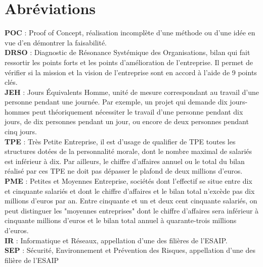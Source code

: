 \section*{Abréviations}

\textbf{POC} : Proof of Concept, réalisation incomplète d'une méthode ou d'une idée en vue d'en démontrer la faisabilité.\cite{POC}
\hfill \\

\textbf{DRSO} : Diagnostic de Résonance Systémique des Organisations, bilan qui fait ressortir les points forts et les points d'amélioration de l'entreprise. Il permet de vérifier si la mission et la vision de l'entreprise sont en accord à l'aide de 9 points clés.\cite{DRSO}
\hfill \\

\textbf{JEH} : Jours Équivalents Homme, unité de mesure correspondant au travail d’une personne pendant une journée. Par exemple, un projet qui demande dix jours-hommes peut théoriquement nécessiter le travail d’une personne pendant dix jours, de dix personnes pendant un jour, ou encore de deux personnes pendant cinq jours.\cite{JEH}
\hfill \\

\textbf{TPE} : Très Petite Entreprise, il est d'usage de qualifier de TPE toutes les structures dotées de la personnalité morale, dont le nombre maximal de salariés est inférieur à dix. Par ailleurs, le chiffre d’affaires annuel ou le total du bilan réalisé par ces TPE ne doit pas dépasser le plafond de deux millions d’euros.\cite{TPEPME}
\hfill \\

\textbf{PME} : Petites et Moyennes Entreprise, sociétés dont l'effectif se situe entre dix et cinquante salariés et dont le chiffre d’affaires et le bilan total n'excède pas dix millions d’euros par an. Entre cinquante et un et deux cent cinquante salariés, on peut distinguer les "moyennes entreprises" dont le chiffre d’affaires sera inférieur à cinquante millions d’euros et le bilan total annuel à quarante-trois millions d’euros.\cite{TPEPME}
\hfill \\

\textbf{IR} : Informatique et Réseaux, appellation d'une des filières de l'ESAIP.
\hfill \\

\textbf{SEP} : Sécurité, Environnement et Prévention des Risques, appellation d'une des filière de l'ESAIP  
\hfill \\

